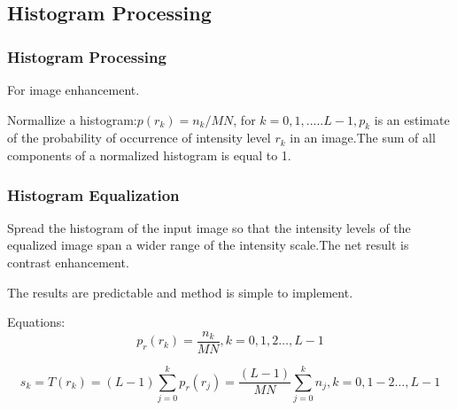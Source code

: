 \documentclass[notheorems, serif, table, compress]{beamer}  %
\begin{document}
\subsection{Histogram Processing}%
 \begin{frame}
\frametitle{Histogram Processing}
 For image enhancement.
    
Normallize a histogram:$p(r_{k})=n_{k}/MN$, for $k=0, 1, .....L-1, p_{k}$ is an estimate of the probability of occurrence of intensity level $r_{k}$ in an image.The sum of all components of a normalized histogram is equal to 1.

    
 \end{frame}



\begin{frame}
\frametitle{Histogram Equalization}%
  Spread the histogram of the input image so that the intensity levels of the equalized image span a wider range of the intensity scale.The net result is contrast enhancement.

 The results are predictable and method is simple to implement.%

Equations:
   \begin{equation}    \label{3.8} %
    p_{r}(r_{k})= \frac{n_{k}}{MN}, k=0, 1, 2\ldots, L-1
   \end{equation}

   \begin{equation} \label {3.9}
     s_{k}=T(r_{k})=(L-1)\sum_{j=0}^{k}p_{r}(r_{j})=\frac{(L-1)}{MN} \sum_    {j=0}^{k}{n_{j}}, k=0, 1-2\ldots, L-1
   \end{equation}
 \end{frame}
\end{document}
